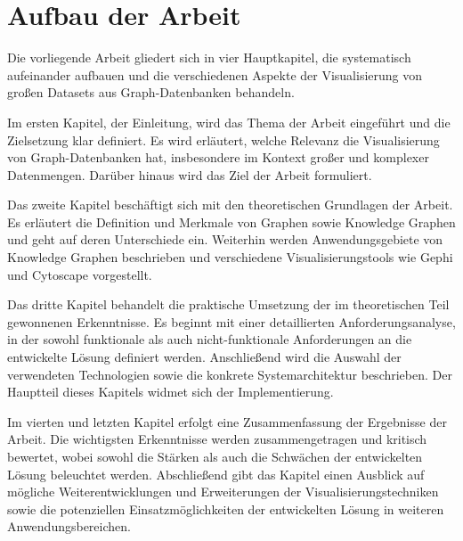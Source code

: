 \section{Aufbau der Arbeit}

Die vorliegende Arbeit gliedert sich in vier Hauptkapitel, die systematisch aufeinander aufbauen und die verschiedenen Aspekte der Visualisierung von großen Datasets aus Graph-Datenbanken behandeln.

Im ersten Kapitel, der Einleitung, wird das Thema der Arbeit eingeführt und die Zielsetzung klar definiert. Es wird erläutert, welche Relevanz die Visualisierung von Graph-Datenbanken hat, insbesondere im Kontext großer und komplexer Datenmengen. Darüber hinaus wird das Ziel der Arbeit formuliert.

Das zweite Kapitel beschäftigt sich mit den theoretischen Grundlagen der Arbeit. Es erläutert die Definition und Merkmale von Graphen sowie Knowledge Graphen und geht auf deren Unterschiede ein. Weiterhin werden Anwendungsgebiete von Knowledge Graphen beschrieben und verschiedene Visualisierungstools wie Gephi und Cytoscape vorgestellt.

Das dritte Kapitel behandelt die praktische Umsetzung der im theoretischen Teil gewonnenen Erkenntnisse. Es beginnt mit einer detaillierten Anforderungsanalyse, in der sowohl funktionale als auch nicht-funktionale Anforderungen an die entwickelte Lösung definiert werden. Anschließend wird die Auswahl der verwendeten Technologien sowie die konkrete Systemarchitektur beschrieben. Der Hauptteil dieses Kapitels widmet sich der Implementierung.

Im vierten und letzten Kapitel erfolgt eine Zusammenfassung der Ergebnisse der Arbeit. Die wichtigsten Erkenntnisse werden zusammengetragen und kritisch bewertet, wobei sowohl die Stärken als auch die Schwächen der entwickelten Lösung beleuchtet werden. Abschließend gibt das Kapitel einen Ausblick auf mögliche Weiterentwicklungen und Erweiterungen der Visualisierungstechniken sowie die potenziellen Einsatzmöglichkeiten der entwickelten Lösung in weiteren Anwendungsbereichen.